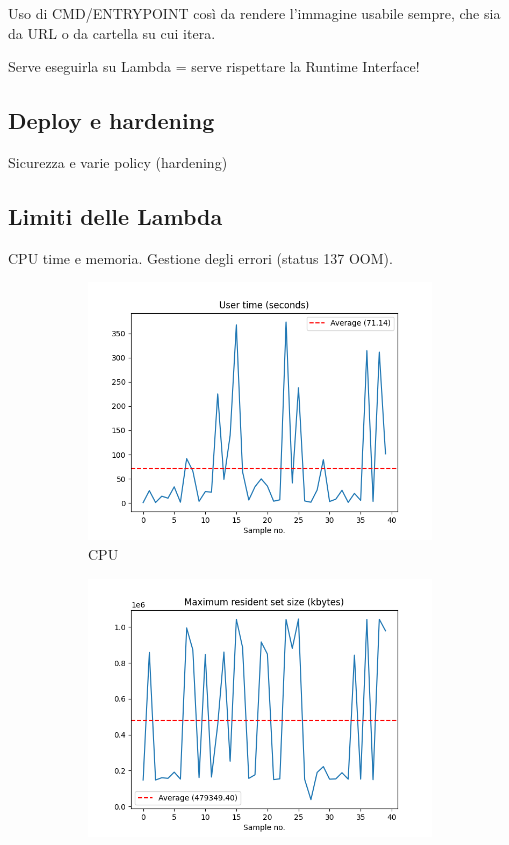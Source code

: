 Uso di CMD/ENTRYPOINT così da rendere l'immagine usabile sempre, che sia da URL o da cartella su cui itera.


Serve eseguirla su Lambda = serve rispettare la Runtime Interface!


\subsection{Deploy e hardening}
Sicurezza e varie policy (hardening)

\subsection{Limiti delle Lambda}

CPU time e memoria. Gestione degli errori (status 137 OOM).

\begin{figure}[H]
     \begin{subfigure}[b]{0.5\textwidth}
         \centering
         \includegraphics[width=\textwidth]{assets/static_analysis_exec_cpu_time.png}
         \caption{CPU}
         \label{fig:static_analysis_exec_cpu_time}
     \end{subfigure}
     \begin{subfigure}[b]{0.5\textwidth}
         \centering
         \includegraphics[width=\textwidth]{assets/static_analysis_exec_memory.png}

\end{subfigure}
\end{figure}

